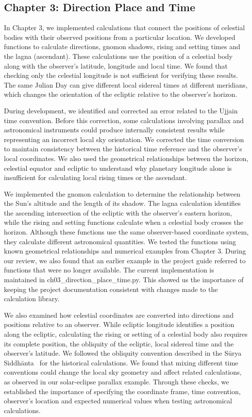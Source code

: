 \documentclass[12pt,a4paper,oneside]{report}
\newcommand{\surya}{Sūrya Siddhānta\xspace}
\begin{document}
\subsection{Chapter 3: Direction Place and Time}

In Chapter 3, we implemented calculations that connect the positions of celestial bodies with their observed positions from a particular location. We developed functions to calculate directions, gnomon shadows, rising and setting times and the lagna (ascendant). These calculations use the position of a celestial body along with the observer's latitude, longitude and local time. We found that checking only the celestial longitude is not sufficient for verifying these results. The same Julian Day can give different local sidereal times at different meridians, which changes the orientation of the ecliptic relative to the observer's horizon.

During development, we identified and corrected an error related to the Ujjain time convention. Before this correction, some calculations involving parallax and astronomical instruments could produce internally consistent results while representing an incorrect local sky orientation. We corrected the time conversion to maintain consistency between the historical time reference and the observer's local coordinates. We also used the geometrical relationships between the horizon, celestial equator and ecliptic to understand why planetary longitude alone is insufficient for calculating local rising times or the ascendant.

We implemented the gnomon calculation to determine the relationship between the Sun's altitude and the length of its shadow. The lagna calculation identifies the ascending intersection of the ecliptic with the observer's eastern horizon, while the rising and setting functions calculate when a celestial body crosses the horizon. Although these functions use the same observer-based coordinate system, they calculate different astronomical quantities. We tested the functions using known geometrical relationships and numerical examples from Chapter 3. During our review, we also found that an earlier example in the project guide referred to functions that were no longer available. The current implementation is maintained in ch03\_direction\_place\_time.py. This showed us the importance of keeping the project documentation consistent with changes made to the calculation library.

We also examined how celestial coordinates are converted into directions and positions relative to an observer. While ecliptic longitude identifies a position along the ecliptic, calculating the rising or setting of a celestial body also requires its complete position, the obliquity of the ecliptic, local sidereal time and the observer's latitude. We followed the obliquity convention described in the \surya~\cite{burgess1860} for the historical calculations. We found that mixing different time conventions could change the local sky geometry and affect related calculations, as observed in our solar-eclipse parallax example. Through these checks, we established the importance of specifying the coordinate frame, time convention, observer's location and expected numerical values when testing astronomical calculations.
\end{document}
